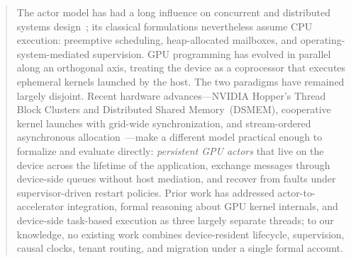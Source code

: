 \begin{abstract}
The actor model has had a long influence on concurrent and
distributed systems design~\citep{hewitt1973actors,agha1986actors};
its classical formulations nevertheless assume CPU execution:
preemptive scheduling, heap-allocated mailboxes, and
operating-system-mediated supervision.
GPU programming has evolved in parallel along an orthogonal axis,
treating the device as a coprocessor that executes ephemeral kernels
launched by the host.  The two paradigms have remained largely
disjoint.  Recent hardware advances—NVIDIA Hopper's Thread Block
Clusters and Distributed Shared Memory~(DSMEM), cooperative kernel
launches with grid-wide synchronization, and stream-ordered
asynchronous allocation~\citep{nvidia2022hopper,nvidia2023cooperative}—make
a different model practical enough to formalize and evaluate
directly: \emph{persistent GPU actors} that live on the device
across the lifetime of the application, exchange messages through
device-side queues without host mediation, and recover from faults
under supervisor-driven restart policies.  Prior work has addressed
actor-to-accelerator integration, formal reasoning about GPU kernel
internals, and device-side task-based execution as three largely
separate threads; to our knowledge, no existing work combines
device-resident lifecycle, supervision, causal clocks, tenant
routing, and migration under a single formal account.


\end{abstract}

